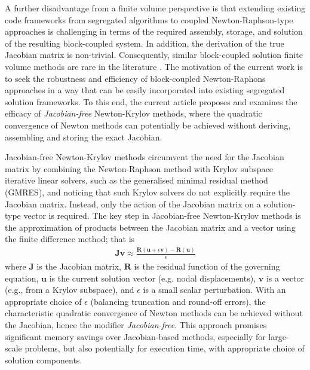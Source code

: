 \documentclass[sn-mathphys,Numbered]{sn-jnl}%
\newcommand{\bb}{\boldsymbol}
\begin{document}
A further disadvantage from a finite volume perspective is that extending existing code frameworks from segregated algorithms to coupled Newton-Raphson-type approaches is challenging in terms of the required assembly, storage, and solution of the resulting block-coupled system.
In addition, the derivation of the true Jacobian matrix is non-trivial.
Consequently, similar block-coupled solution finite volume methods are rare in the literature \citep{Das2011, Cardiff2016, Castrillo2024}.
The motivation of the current work is to seek the robustness and efficiency of block-coupled Newton-Raphons approaches in a way that can be easily incorporated into existing segregated solution frameworks.
To this end, the current article proposes and examines the efficacy of \emph{Jacobian-free} Newton-Krylov methods, where the quadratic convergence of Newton methods can potentially be achieved without deriving, assembling and storing the exact Jacobian.

Jacobian-free Newton-Krylov methods circumvent the need for the Jacobian matrix by combining the Newton-Raphson method with Krylov subspace iterative linear solvers, such as the generalised minimal residual method (GMRES), and noticing that such Krylov solvers do not explicitly require the Jacobian matrix.
Instead, only the action of the Jacobian matrix on a solution-type vector is required.
The key step in Jacobian-free Newton-Krylov methods is the approximation of products between the Jacobian matrix and a vector using the finite difference method; that is
\begin{eqnarray}
	\bb{J} \bb{v} \approx \frac{\bb{R}(\bb{u} + \epsilon \bb{v}) - \bb{R}(\bb{u})}{\epsilon}
\end{eqnarray}
where $\bb{J}$ is the Jacobian matrix, $\bb{R}$ is the residual function of the governing equation, $\mathbf{u}$ is the current solution vector (e.g. nodal displacements), $\mathbf{v}$ is a vector (e.g., from a Krylov subspace), and $\epsilon$ is a small scalar perturbation.
With an appropriate choice of $\epsilon$ (balancing truncation and round-off errors), the characteristic quadratic convergence of Newton methods can be achieved without the Jacobian, hence the modifier \emph{Jacobian-free}.
This approach promises significant memory savings over Jacobian-based methods, especially for large-scale problems, but also potentially for execution time, with appropriate choice of solution components.
\end{document}
